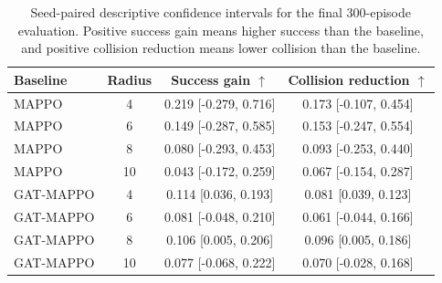 \begin{table}[t]
\centering
\caption{Seed-paired descriptive confidence intervals for the final 300-episode evaluation. Positive success gain means higher success than the baseline, and positive collision reduction means lower collision than the baseline.}
\label{tab:final_300_paired_ci}
\begin{tabular}{lccc}
\toprule
Baseline & Radius & Success gain $\uparrow$ & Collision reduction $\uparrow$ \\
\midrule
MAPPO & 4 & 0.219 [-0.279, 0.716] & 0.173 [-0.107, 0.454] \\
MAPPO & 6 & 0.149 [-0.287, 0.585] & 0.153 [-0.247, 0.554] \\
MAPPO & 8 & 0.080 [-0.293, 0.453] & 0.093 [-0.253, 0.440] \\
MAPPO & 10 & 0.043 [-0.172, 0.259] & 0.067 [-0.154, 0.287] \\
\midrule
GAT-MAPPO & 4 & 0.114 [0.036, 0.193] & 0.081 [0.039, 0.123] \\
GAT-MAPPO & 6 & 0.081 [-0.048, 0.210] & 0.061 [-0.044, 0.166] \\
GAT-MAPPO & 8 & 0.106 [0.005, 0.206] & 0.096 [0.005, 0.186] \\
GAT-MAPPO & 10 & 0.077 [-0.068, 0.222] & 0.070 [-0.028, 0.168] \\
\bottomrule
\end{tabular}
\end{table}
